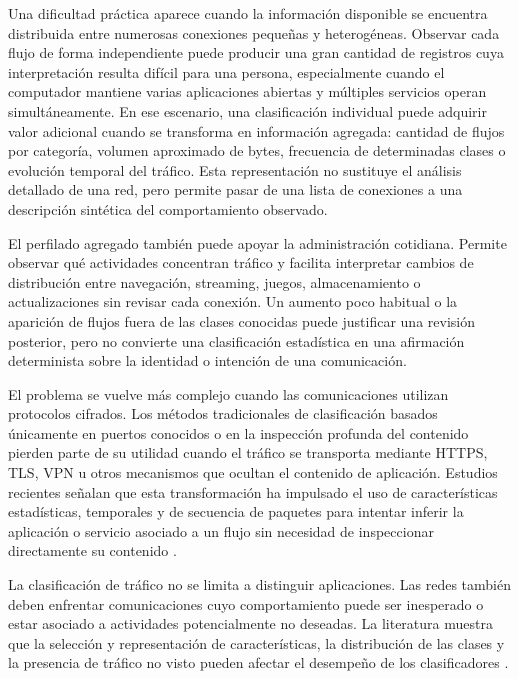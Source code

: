 \documentclass[conference]{IEEEtran}
\begin{document}
Una dificultad práctica aparece cuando la información disponible se encuentra distribuida entre numerosas conexiones pequeñas y heterogéneas. Observar cada flujo de forma independiente puede producir una gran cantidad de registros cuya interpretación resulta difícil para una persona, especialmente cuando el computador mantiene varias aplicaciones abiertas y múltiples servicios operan simultáneamente. En ese escenario, una clasificación individual puede adquirir valor adicional cuando se transforma en información agregada: cantidad de flujos por categoría, volumen aproximado de bytes, frecuencia de determinadas clases o evolución temporal del tráfico. Esta representación no sustituye el análisis detallado de una red, pero permite pasar de una lista de conexiones a una descripción sintética del comportamiento observado.

El perfilado agregado también puede apoyar la administración cotidiana. Permite observar qué actividades concentran tráfico y facilita interpretar cambios de distribución entre navegación, streaming, juegos, almacenamiento o actualizaciones sin revisar cada conexión. Un aumento poco habitual o la aparición de flujos fuera de las clases conocidas puede justificar una revisión posterior, pero no convierte una clasificación estadística en una afirmación determinista sobre la identidad o intención de una comunicación.

El problema se vuelve más complejo cuando las comunicaciones utilizan protocolos cifrados. Los métodos tradicionales de clasificación basados únicamente en puertos conocidos o en la inspección profunda del contenido pierden parte de su utilidad cuando el tráfico se transporta mediante HTTPS, TLS, VPN u otros mecanismos que ocultan el contenido de aplicación. Estudios recientes señalan que esta transformación ha impulsado el uso de características estadísticas, temporales y de secuencia de paquetes para intentar inferir la aplicación o servicio asociado a un flujo sin necesidad de inspeccionar directamente su contenido \cite{shen2023,ahmed2021,roy2022,zaki2022}.

La clasificación de tráfico no se limita a distinguir aplicaciones. Las redes también deben enfrentar comunicaciones cuyo comportamiento puede ser inesperado o estar asociado a actividades potencialmente no deseadas. La literatura muestra que la selección y representación de características, la distribución de las clases y la presencia de tráfico no visto pueden afectar el desempeño de los clasificadores \cite{shen2023,jin2024,liang2024,afuwape2021,pathmaperuma2022}.
\end{document}
